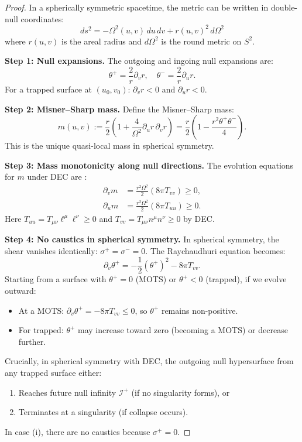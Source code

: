 \begin{proof}
In a spherically symmetric spacetime, the metric can be written in double-null coordinates:
\begin{equation}
ds^2 = -\Omega^2(u, v) \, du \, dv + r(u, v)^2 \, d\Omega^2
\end{equation}
where $r(u, v)$ is the areal radius and $d\Omega^2$ is the round metric on $S^2$.

\textbf{Step 1: Null expansions.}
The outgoing and ingoing null expansions are:
\begin{equation}
\theta^+ = \frac{2}{r}\partial_v r, \quad \theta^- = \frac{2}{r}\partial_u r.
\end{equation}
For a trapped surface at $(u_0, v_0)$: $\partial_v r < 0$ and $\partial_u r < 0$.

\textbf{Step 2: Misner--Sharp mass.}
Define the Misner--Sharp mass:
\begin{equation}
m(u, v) := \frac{r}{2}\left(1 + \frac{4}{\Omega^2}\partial_u r \, \partial_v r\right) = \frac{r}{2}\left(1 - \frac{r^2 \theta^+ \theta^-}{4}\right).
\end{equation}
This is the unique quasi-local mass in spherical symmetry.

\textbf{Step 3: Mass monotonicity along null directions.}
The evolution equations for $m$ under DEC are \cite{hayward1994}:
\begin{align}
\partial_v m &= \frac{r^2 \Omega^2}{2} \left(8\pi T_{vv}\right) \geq 0, \\
\partial_u m &= \frac{r^2 \Omega^2}{2} \left(8\pi T_{uu}\right) \geq 0.
\end{align}
Here $T_{uu} = T_{\mu\nu}\ell^\mu\ell^\nu \geq 0$ and $T_{vv} = T_{\mu\nu}n^\mu n^\nu \geq 0$ by DEC.

\textbf{Step 4: No caustics in spherical symmetry.}
In spherical symmetry, the shear vanishes identically: $\sigma^+ = \sigma^- = 0$. The Raychaudhuri equation becomes:
\begin{equation}
\partial_v \theta^+ = -\frac{1}{2}(\theta^+)^2 - 8\pi T_{vv}.
\end{equation}
Starting from a surface with $\theta^+ = 0$ (MOTS) or $\theta^+ < 0$ (trapped), if we evolve outward:
\begin{itemize}
\item At a MOTS: $\partial_v \theta^+ = -8\pi T_{vv} \leq 0$, so $\theta^+$ remains non-positive.
\item For trapped: $\theta^+$ may increase toward zero (becoming a MOTS) or decrease further.
\end{itemize}
Crucially, in spherical symmetry with DEC, the outgoing null hypersurface from any trapped surface either:
\begin{enumerate}[label=(\roman*)]
\item Reaches future null infinity $\mathscr{I}^+$ (if no singularity forms), or
\item Terminates at a singularity (if collapse occurs).
\end{enumerate}
In case (i), there are no caustics because $\sigma^+ = 0$.


\end{proof}
